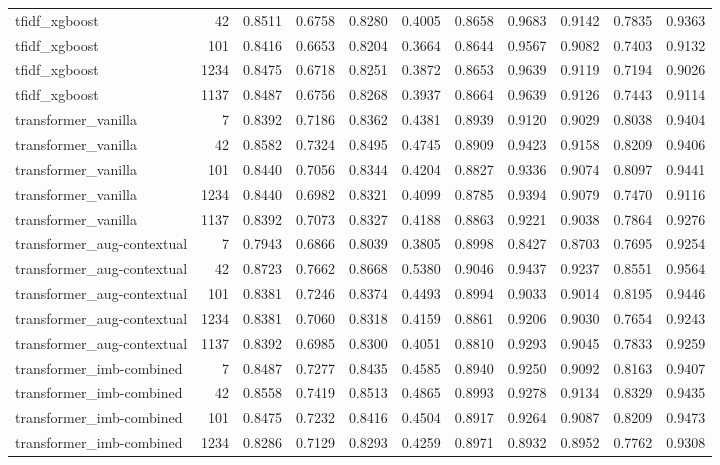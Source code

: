 \begin{table}
\begin{tabular}{lrrrrrrrrrr}
tfidf\_xgboost & 42 & 0.8511 & 0.6758 & 0.8280 & 0.4005 & 0.8658 & 0.9683 & 0.9142 & 0.7835 & 0.9363 \\
tfidf\_xgboost & 101 & 0.8416 & 0.6653 & 0.8204 & 0.3664 & 0.8644 & 0.9567 & 0.9082 & 0.7403 & 0.9132 \\
tfidf\_xgboost & 1234 & 0.8475 & 0.6718 & 0.8251 & 0.3872 & 0.8653 & 0.9639 & 0.9119 & 0.7194 & 0.9026 \\
tfidf\_xgboost & 1137 & 0.8487 & 0.6756 & 0.8268 & 0.3937 & 0.8664 & 0.9639 & 0.9126 & 0.7443 & 0.9114 \\
transformer\_vanilla & 7 & 0.8392 & 0.7186 & 0.8362 & 0.4381 & 0.8939 & 0.9120 & 0.9029 & 0.8038 & 0.9404 \\
transformer\_vanilla & 42 & 0.8582 & 0.7324 & 0.8495 & 0.4745 & 0.8909 & 0.9423 & 0.9158 & 0.8209 & 0.9406 \\
transformer\_vanilla & 101 & 0.8440 & 0.7056 & 0.8344 & 0.4204 & 0.8827 & 0.9336 & 0.9074 & 0.8097 & 0.9441 \\
transformer\_vanilla & 1234 & 0.8440 & 0.6982 & 0.8321 & 0.4099 & 0.8785 & 0.9394 & 0.9079 & 0.7470 & 0.9116 \\
transformer\_vanilla & 1137 & 0.8392 & 0.7073 & 0.8327 & 0.4188 & 0.8863 & 0.9221 & 0.9038 & 0.7864 & 0.9276 \\
transformer\_aug-contextual & 7 & 0.7943 & 0.6866 & 0.8039 & 0.3805 & 0.8998 & 0.8427 & 0.8703 & 0.7695 & 0.9254 \\
transformer\_aug-contextual & 42 & 0.8723 & 0.7662 & 0.8668 & 0.5380 & 0.9046 & 0.9437 & 0.9237 & 0.8551 & 0.9564 \\
transformer\_aug-contextual & 101 & 0.8381 & 0.7246 & 0.8374 & 0.4493 & 0.8994 & 0.9033 & 0.9014 & 0.8195 & 0.9446 \\
transformer\_aug-contextual & 1234 & 0.8381 & 0.7060 & 0.8318 & 0.4159 & 0.8861 & 0.9206 & 0.9030 & 0.7654 & 0.9243 \\
transformer\_aug-contextual & 1137 & 0.8392 & 0.6985 & 0.8300 & 0.4051 & 0.8810 & 0.9293 & 0.9045 & 0.7833 & 0.9259 \\
transformer\_imb-combined & 7 & 0.8487 & 0.7277 & 0.8435 & 0.4585 & 0.8940 & 0.9250 & 0.9092 & 0.8163 & 0.9407 \\
transformer\_imb-combined & 42 & 0.8558 & 0.7419 & 0.8513 & 0.4865 & 0.8993 & 0.9278 & 0.9134 & 0.8329 & 0.9435 \\
transformer\_imb-combined & 101 & 0.8475 & 0.7232 & 0.8416 & 0.4504 & 0.8917 & 0.9264 & 0.9087 & 0.8209 & 0.9473 \\
transformer\_imb-combined & 1234 & 0.8286 & 0.7129 & 0.8293 & 0.4259 & 0.8971 & 0.8932 & 0.8952 & 0.7762 & 0.9308 \\

\end{tabular}
\end{table}
